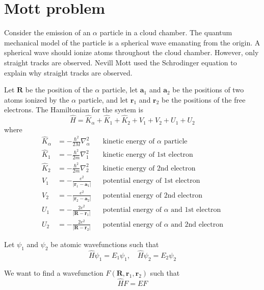 \documentclass[12pt]{article}
\begin{document}
\section*{Mott problem}

Consider the emission of an $\alpha$ particle in a cloud chamber.
The quantum mechanical model of the particle is a spherical wave emanating from the origin.
A spherical wave should ionize atoms throughout the cloud chamber.
However, only straight tracks are observed.
Nevill Mott used the Schrodinger equation to explain why straight tracks are observed.

\bigskip

Let $\mathbf R$ be the position of the $\alpha$ particle,
let $\mathbf a_1$ and $\mathbf a_2$ be the positions of two atoms ionized by the $\alpha$ particle,
and let $\mathbf r_1$ and $\mathbf r_2$ be the positions of the free electrons.
The Hamiltonian for the system is
\begin{equation*}
\hat H=\hat K_\alpha+\hat K_1+\hat K_2+V_1+V_2+U_1+U_2
\end{equation*}
where
\begin{align*}
\hat K_\alpha&=-\frac{\hbar^2}{2M}\nabla_\alpha^2 & & \text{kinetic energy of $\alpha$ particle}
\\[1ex]
\hat K_1&=-\frac{\hbar^2}{2m}\nabla_1^2 & & \text{kinetic energy of 1st electron}
\\[1ex]
\hat K_2&=-\frac{\hbar^2}{2m}\nabla_2^2 & & \text{kinetic energy of 2nd electron}
\\[1ex]
V_1&=-\frac{e^2}{|\mathbf r_1-\mathbf a_1|} & & \text{potential energy of 1st electron}
\\[1ex]
V_2&=-\frac{e^2}{|\mathbf r_2-\mathbf a_2|} & & \text{potential energy of 2nd electron}
\\[1ex]
U_1&=-\frac{2e^2}{|\mathbf R-\mathbf r_1|} & & \text{potential energy of $\alpha$ and 1st electron}
\\[1ex]
U_2&=-\frac{2e^2}{|\mathbf R-\mathbf r_2|} & & \text{potential energy of $\alpha$ and 2nd electron}
\end{align*}

Let $\psi_1$ and $\psi_2$ be atomic wavefunctions such that
\begin{equation*}
\hat H\psi_1=E_1\psi_1,
\quad
\hat H\psi_2=E_2\psi_2
\end{equation*}

We want to find a wavefunction $F(\mathbf R,\mathbf r_1,\mathbf r_2)$ such that
\begin{equation*}
\hat HF=EF
\end{equation*}
\end{document}
